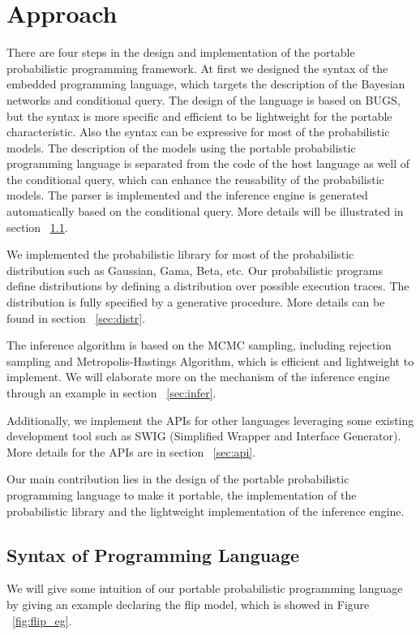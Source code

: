 \chapter{Approach}
\label{chap:approach}
There are four steps in the design and implementation of the portable probabilistic programming framework. At first we designed the syntax of the embedded programming language, which targets the description of the Bayesian networks and conditional query.  The design of the language is based on BUGS, but the syntax is more specific and efficient to be lightweight for the portable characteristic. Also the syntax can be expressive for most of the probabilistic models. The description of the models using the portable probabilistic programming language is separated from the code of the host language as well of the conditional query, which can enhance the reusability of the probabilistic models. The parser is implemented and the inference engine is generated automatically based on the conditional query. More details will be illustrated in section ~\ref{sec:syntax}. 

We implemented the probabilistic library for most of the probabilistic distribution such as Gaussian, Gama, Beta, etc. Our probabilistic programs define distributions by defining a distribution over possible execution traces. The distribution is fully specified by a generative procedure. More details can be found in section ~\ref{sec:distr}. 

The inference algorithm is based on the MCMC sampling, including rejection sampling and Metropolis-Hastings Algorithm, which is efficient and lightweight to implement. We will elaborate more on the mechanism of the inference engine through an example in section ~\ref{sec:infer}. 

Additionally, we implement the APIs for other languages leveraging some existing development tool such as SWIG (Simplified Wrapper and Interface Generator). More details for the APIs are in section ~\ref{sec:api}.

Our main contribution lies in the design of the portable probabilistic programming language to make it portable, the implementation of the probabilistic library and the lightweight implementation of the inference engine.


\section{Syntax of Programming Language}
\label{sec:syntax}
We will give some intuition of our portable probabilistic programming language by giving an example declaring the flip model, which is showed in Figure ~\ref{fig:flip_eg}. 

